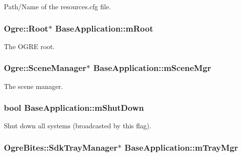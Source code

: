 \-Path/\-Name of the resources.\-cfg file. \hypertarget{classBaseApplication_add84ba707dc6c57e6283f214b1274110}{
\subsubsection[{m\-Root}]{\setlength{\rightskip}{0pt plus 5cm}\-Ogre\-::\-Root$\ast$ {\bf \-Base\-Application\-::m\-Root}}}\label{classBaseApplication_add84ba707dc6c57e6283f214b1274110}
\-The \-O\-G\-R\-E root. \hypertarget{classBaseApplication_a8a7684f4f9a57ed3089048ad1a913b2d}{
\subsubsection[{m\-Scene\-Mgr}]{\setlength{\rightskip}{0pt plus 5cm}\-Ogre\-::\-Scene\-Manager$\ast$ {\bf \-Base\-Application\-::m\-Scene\-Mgr}}}\label{classBaseApplication_a8a7684f4f9a57ed3089048ad1a913b2d}
\-The scene manager. \hypertarget{classBaseApplication_a755f26d3a9915aaf830750d877e39d86}{
\subsubsection[{m\-Shut\-Down}]{\setlength{\rightskip}{0pt plus 5cm}bool {\bf \-Base\-Application\-::m\-Shut\-Down}}}\label{classBaseApplication_a755f26d3a9915aaf830750d877e39d86}
\-Shut down all systems (broadcasted by this flag). \hypertarget{classBaseApplication_a7faa397f4f4861ee8c361a01e90b4416}{
\subsubsection[{m\-Tray\-Mgr}]{\setlength{\rightskip}{0pt plus 5cm}\-Ogre\-Bites\-::\-Sdk\-Tray\-Manager$\ast$ {\bf \-Base\-Application\-::m\-Tray\-Mgr}}}\label{classBaseApplication_a7faa397f4f4861ee8c361a01e90b4416}
